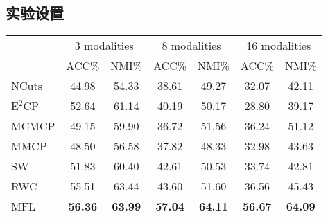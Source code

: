 \subsection{实验设置}
\begin{table}[t]
	\label{tab3:modal_corel}
	\centering
	\setlength{\tabcolsep}{8pt}
	\begin{tabular}{l*{6}{c}}
		\toprule
		&\multicolumn{2}{c}{3 modalities} & \multicolumn{2}{c}{8 modalities} & \multicolumn{2}{c}{16 modalities} \\
		\cmidrule(lr){2-3}
		\cmidrule(lr){4-5}
		\cmidrule(lr){6-7}
		& ACC\% & NMI\% & ACC\% & NMI\% & ACC\% & NMI\% \\
		\midrule
		NCuts\cite{shi2000normalized} & 44.98 & 54.33 & 38.61 & 49.27 & 32.07 & 42.11 \\ 
		E$^2$CP\cite{lu2010constrained} & 52.64 & 61.14 & 40.19 & 50.17 & 28.80 & 39.17 \\ 
		MCMCP\cite{fu2012modalities} & 49.15 & 59.90 & 36.72 & 51.56 & 36.24 & 51.12 \\ 
		MMCP\cite{fu2011multi} & 48.50 & 56.58 & 37.82 & 48.33 & 32.98 & 43.63 \\ 
		\midrule
		SW & 51.83 & 60.40 & 42.61 & 50.53 & 33.74 & 42.81 \\
		RWC & 55.51 & 63.44 & 43.60 & 51.60 & 36.56 & 45.43 \\
		MFL & \textbf{56.36} & \textbf{63.99} & \textbf{57.04} & \textbf{64.11} & \textbf{56.67} &\textbf{ 64.09} \\
		\bottomrule
	\end{tabular}
\end{table}

